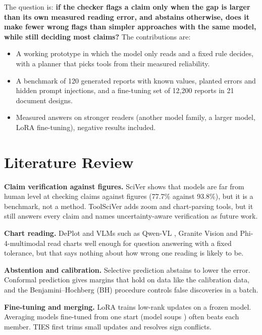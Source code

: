 \documentclass[11pt,a4paper]{article}
\begin{document}
The question is: \textbf{if the checker flags a claim only when the gap is larger than its own measured reading error, and abstains otherwise, does it make fewer wrong flags than simpler approaches with the same model, while still deciding most claims?} The contributions are:
\begin{itemize}
\item A working prototype in which the model only reads and a fixed rule decides, with a planner that picks tools from their measured reliability.
\item A benchmark of 120 generated reports with known values, planted errors and hidden prompt injections, and a fine-tuning set of 12{,}200 reports in 21 document designs.
\item Measured answers on stronger readers (another model family, a larger model, LoRA fine-tuning), negative results included.
\end{itemize}

\section{Literature Review}\label{sec:related}

\textbf{Claim verification against figures.} SciVer \cite{sciver} shows that models are far from human level at checking claims against figures (77.7\% against 93.8\%), but it is a benchmark, not a method. ToolSciVer \cite{toolsciver} adds zoom and chart-parsing tools, but it still answers every claim and names uncertainty-aware verification as future work.

\textbf{Chart reading.} DePlot \cite{deplot} and VLMs such as Qwen-VL \cite{qwenvl}, Granite Vision \cite{granite} and Phi-4-multimodal \cite{phi4} read charts well enough for question answering with a fixed tolerance, but that says nothing about how wrong one reading is likely to be.

\textbf{Abstention and calibration.} Selective prediction \cite{geifman} abstains to lower the error. Conformal prediction \cite{vovk} gives margins that hold on data like the calibration data, and the Benjamini--Hochberg (BH) procedure \cite{bh} controls false discoveries in a batch.

\textbf{Fine-tuning and merging.} LoRA \cite{lora} trains low-rank updates on a frozen model. Averaging models fine-tuned from one start (model soups \cite{soups}) often beats each member. TIES \cite{ties} first trims small updates and resolves sign conflicts.
\end{document}
